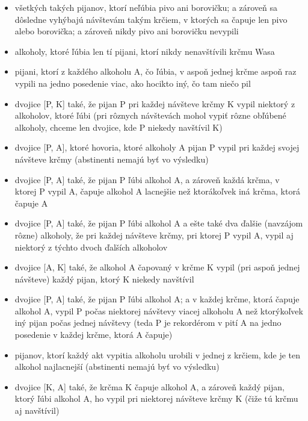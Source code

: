 \documentclass[10pt, a4paper]{article}
\theoremstyle{definition}
\begin{document}
\begin{enumerate}
\begin{itemize}
    \item všetkých takých pijanov, ktorí neľúbia pivo ani borovičku; a zároveň sa dôsledne vyhýbajú návštevám takým krčiem, v ktorých sa čapuje len pivo alebo borovička;
            a zároveň nikdy pivo ani borovičku nevypili
    \item alkoholy, ktoré ľúbia len tí pijani, ktorí nikdy nenavštívili krčmu Wasa
    \item pijani, ktorí z každého alkoholu A, čo ľúbia, v aspoň jednej krčme aspoň raz vypili na jedno posedenie viac, ako hocikto iný, čo tam niečo pil
    \item dvojice [P, K] také, že pijan P pri každej návšteve krčmy K vypil niektorý z alkoholov, ktoré ľúbi
            (pri rôznych návštevách mohol vypiť rôzne obľúbené alkoholy, chceme len dvojice, kde P niekedy navštívil K) 
    \item dvojice [P, A], ktoré hovoria, ktoré alkoholy A pijan P vypil pri každej svojej návšteve krčmy (abstinenti nemajú byť vo výsledku)
    \item dvojice [P, A] také, že pijan P ľúbi alkohol A, a zároveň každá krčma, v ktorej P vypil A, čapuje alkohol A lacnejšie než ktorákoľvek iná krčma, ktorá čapuje A
    \item dvojice [P, A] také, že pijan P ľúbi alkohol A a ešte také dva ďalšie (navzájom rôzne) alkoholy, že pri každej návšteve krčmy,
            pri ktorej P vypil A, vypil aj niektorý z týchto dvoch ďalších alkoholov
    \item dvojice [A, K] také, že alkohol A čapovaný v krčme K vypil (pri aspoň jednej návšteve) každý pijan, ktorý K niekedy navštívil
    \item dvojice [P, A] také, že pijan P ľúbi alkohol A; a v každej krčme, ktorá čapuje alkohol A, vypil P počas niektorej
            návštevy viacej alkoholu A než ktorýkoľvek iný pijan počas jednej návštevy (teda P je rekordérom v pití A na jedno posedenie v každej krčme, ktorá A čapuje)
    \item pijanov, ktorí každý akt vypitia alkoholu urobili v jednej z krčiem, kde je ten alkohol najlacnejší (abstinenti nemajú byť vo výsledku)    
    \item dvojice [K, A] také, že krčma K čapuje alkohol A, a zároveň každý pijan, ktorý ľúbi alkohol A, ho vypil pri niektorej návšteve krčmy K (čiže tú krčmu aj navštívil)
\end{itemize}

\end{enumerate}
\end{document}

